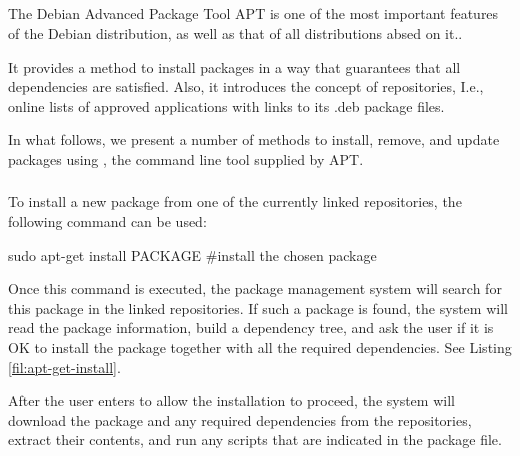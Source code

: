 \subsection{}

The Debian Advanced Package Tool \acs{APT} is one of the most important features of the Debian distribution, as well as that of all distributions absed on it..

It provides a method to install packages in a way that guarantees that all dependencies are satisfied. Also, it introduces the concept of repositories, I.e., online lists of approved applications with links to its .deb package files.

In what follows, we present a number of methods to install, remove, and update packages using , the command line tool supplied by \acs{APT}.

\subsubsection*{}
\label{sec:apt-get-install}

To install a new package from one of the currently linked repositories, the following command can be used:

\begin{command_line}[make]
sudo apt-get install PACKAGE #install the chosen package
\end{command_line}

Once this command is executed, the package management system will search for this package in the linked repositories. If such a package is found, the system will read the package information, build a dependency tree, and ask the user if it is OK to install the package together with all the required dependencies. See Listing \ref{fil:apt-get-install}.

After the user enters  to allow the installation to proceed, the system will download the package and any required dependencies from the repositories, extract their contents, and run any scripts that are indicated in the  package file.  



